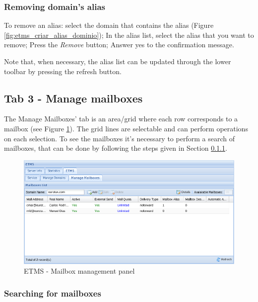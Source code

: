 \subsubsection{Removing domain's alias}
\label{sec:etms_sub_remocao_alias_dominio}
To remove an alias: select the domain that contains the alias (Figure \ref{fig:etms_criar_alias_dominio}); In the alias list, select the alias that you want to remove; Press the \textit{Remove} button; Answer yes to the confirmation message.

Note that, when necessary, the alias list can be updated through the lower toolbar by pressing the refresh button.

\subsection{Tab 3 - Manage mailboxes}
\label{sec:etms_caixas_correio}
The Manage Mailboxes' tab is an area/grid where each row corresponds to a mailbox (see Figure \ref{fig:etms_gerir_mailboxes_mb}). The grid lines are selectable and can perform operations on each selection. To see the mailboxes it's necessary to perform a search of mailboxes, that can be done by following the steps given in Section \ref{sec:etms_sub_pesquisar_caixas_correio}.

\begin{figure}[H]
    \begin{center}
    \includegraphics[scale=0.4]{screenshots/etms/etms_gerir_mailboxes.png}
    \caption{ETMS - Mailbox management panel}
    \label{fig:etms_gerir_mailboxes_mb}
    \end{center}
\end{figure}


\subsubsection{Searching for mailboxes}
\label{sec:etms_sub_pesquisar_caixas_correio}

